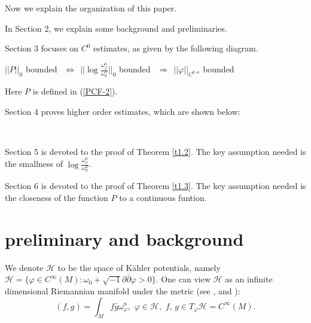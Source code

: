 \documentclass[11pt]{amsart}
\numberwithin{equation}{section}
\newcommand \eps{\varepsilon}
\begin{document}
Now we explain the organization of this paper.  

In Section 2,  we explain some background and preliminaries.

Section 3 focuses on $C^0$ estimates,  as given by the following diagram.
		\begin{center}
			$||P||_0$ bounded $\ \  \Longleftrightarrow\ \  ||\log\frac{\omega_{\varphi}^n}{\omega_0^n}||_0$ bounded $\ \  \Longrightarrow\ \  ||\varphi ||_{C^{0,\alpha}}$ bounded \\[4mm]
		\end{center} 
Here $P$ is defined in (\ref{PCF-2}).  

Section 4 proves higher order estimates,  which are shown below:
\begin{center}
	\\[4mm]
	\end{center}	

Section 5 is devoted to the proof of Theorem \ref{t1.2}.  The key assumption needed is the smallness of $\log\frac{\omega_{\varphi}^n}{\omega_0^n}$.

Section 6 is devoted to the proof of Theorem \ref{t1.3}.  The key assumption needed is the closeness of the function $P$ to a continuous funtion.

\section{preliminary and background}

We denote $\mathcal{H}$ to be the space of K\"ahler potentials,  namely $\mathcal{H}=\{\varphi\in C^{\infty}(M):\omega_0+\sqrt{-1}\partial\bar{\partial}\varphi>0\}$.  One can view $\mathcal{H}$ as an infinite dimensional Riemannian manifold under the metric (see \cite{Dona96},  \cite{Mabuchi} and \cite{semmes}):
\begin{equation}\label{2.1}
(f,g)=\int_Mf\bar{g}\omega_{\varphi}^n,\,\,\varphi\in \mathcal{H},\,\,f,\,g\in T_{\varphi}\mathcal{H}=C^{\infty}(M).
\end{equation}
\end{document}

